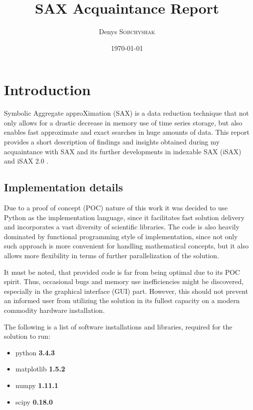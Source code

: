\documentclass{article}
\title{SAX Acquaintance Report}
\author{Denys \textsc{Sobchyshak}}
\date{\today}
\begin{document}
\maketitle

\section{Introduction}
Symbolic Aggregate approXimation (SAX) is a data reduction technique that not only allows for a drastic decrease in memory use of time series storage, but also enables fast approximate and exact searches in huge amounts of data. This report provides a short description of findings and insights obtained during my acquaintance with SAX \cite{lin2007experiencing} and its further developments in indexable SAX (iSAX) \cite{shieh2008sax} and iSAX 2.0 \cite{camerra2010isax}.

\subsection{Implementation details}
Due to a proof of concept (POC) nature of this work it was decided to use Python as the implementation language, since it facilitates fast solution delivery and incorporates a vast diversity of scientific libraries. The code is also heavily dominated by functional programming style of implementation, since not only such approach is more convenient for handling mathematical concepts, but it also allows more flexibility in terms of further parallelization of the solution.\par
It must be noted, that provided code is far from being optimal due to its POC spirit. Thus, occasional bugs and memory use inefficiencies might be discovered, especially in the graphical interface (GUI) part. However, this should not prevent an informed user from utilizing the solution in its fullest capacity on a modern commodity hardware installation.\par
The following is a list of software installations and libraries, required for the solution to run:
\begin{itemize}
	\item python \textbf{3.4.3}
	\item matplotlib \textbf{1.5.2}
	\item numpy \textbf{1.11.1}
	\item scipy \textbf{0.18.0}
\end{itemize}
\end{document}
